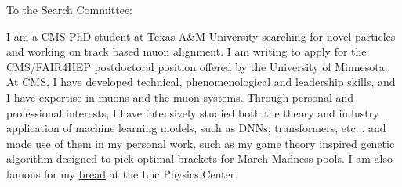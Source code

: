 \documentclass[11pt]{article}
\begin{document}




\bigskip

To the Search Committee: 

I am a CMS PhD student at Texas A\&M University searching for novel particles and working on track based muon alignment. I am writing to apply for the CMS/FAIR4HEP postdoctoral position offered by the University of Minnesota. At CMS, I have developed technical, phenomenological and leadership skills, and I have  expertise in muons and the muon systems. Through personal and professional interests, I have intensively studied both the theory and industry application of machine learning models, such as DNNs, transformers, etc... and made use of them in my personal work, such as my game theory inspired genetic algorithm designed to pick optimal brackets for March Madness pools. I am also famous for my \href{https://www.symmetrymagazine.org/article/the-sourdough-starter-physics-family}{bread} at the Lhc Physics Center. 
\end{document}
